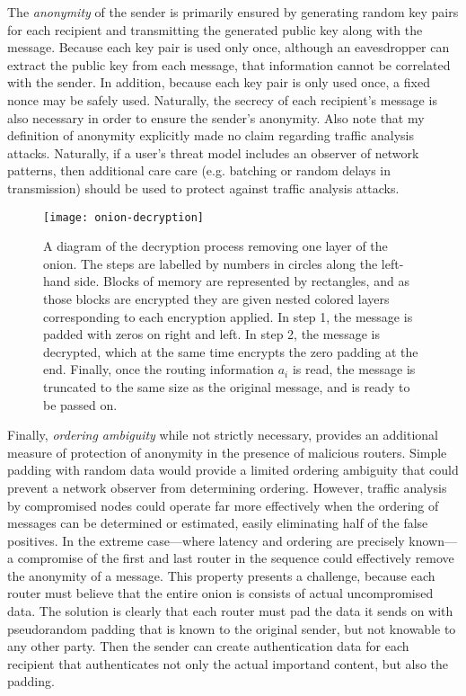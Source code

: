 \documentclass[letterpaper,twocolumn,amsmath,amssymb,pre,aps,10pt]{revtex4-1}
\begin{document}
The \emph{anonymity} of the sender is primarily ensured by generating
random key pairs for each recipient and transmitting the generated
public key along with the message.  Because each key pair is used only
once, although an eavesdropper can extract the public key from each
message, that information cannot be correlated with the sender.  In
addition, because each key pair is only used once, a fixed nonce may
be safely used.  Naturally, the secrecy of each recipient's message is
also necessary in order to ensure the sender's anonymity.  Also note
that my definition of anonymity explicitly made no claim regarding
traffic analysis attacks.  Naturally, if a user's threat model
includes an observer of network patterns, then additional care care
(e.g. batching or random delays in transmission) should be used to
protect against traffic analysis attacks.

\begin{figure*}
  \begin{center}
    \vspace{-6em}
    \texttt{[image: onion-decryption]}
    \vspace{-9em}
  \end{center}
  \caption{A diagram of the decryption process removing one layer of
    the onion.  The steps are labelled by numbers in circles along the
    left-hand side. Blocks of memory are represented by rectangles,
    and as those blocks are encrypted they are given nested colored
    layers corresponding to each encryption applied.  In step 1, the
    message is padded with zeros on right and left.  In step 2, the
    message is decrypted, which at the same time encrypts the zero
    padding at the end.  Finally, once the routing information $a_i$
    is read, the message is truncated to the same size as the original
    message, and is ready to be passed on.}\label{fig:decryption}
\end{figure*}

Finally, \emph{ordering ambiguity} while not strictly necessary,
provides an additional measure of protection of anonymity in the
presence of malicious routers.  Simple padding with random data would
provide a limited ordering ambiguity that could prevent a network
observer from determining ordering.  However, traffic analysis by
compromised nodes could operate far more effectively when the ordering
of messages can be determined or estimated, easily eliminating half of
the false positives.  In the extreme case---where latency and ordering
are precisely known---a compromise of the first and last router in the
sequence could effectively remove the anonymity of a message.  This
property presents a challenge, because each router must believe that
the entire onion is consists of actual uncompromised data.  The
solution is clearly that each router must pad the data it sends on
with pseudorandom padding that is known to the original sender, but
not knowable to any other party.  Then the sender can create
authentication data for each recipient that authenticates not only the
actual importand content, but also the padding.
\end{document}
